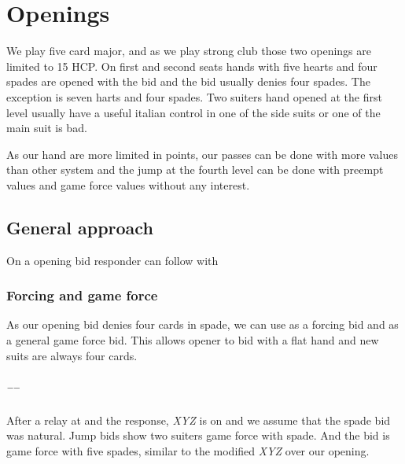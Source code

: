 \chapter{\bid{1\HS/\SpS} Openings}
We play five card major, and as we play strong club those two openings are limited to 15 HCP. On first and second seats hands with five hearts and four spades are opened with the \bid{2\HS} bid and the \bid{1\HS} bid usually denies four spades. The exception is seven harts and four spades. Two suiters hand opened at the first level usually have a useful italian control in one of the side suits or one of the main suit is bad.

As our hand are more limited in points, our passes can be done with more values than other system and the jump at the fourth level can be done with preempt values and game force values without any interest. 
\section{General approach}
On a \bid{1\HS/\SpS} opening bid responder can follow with
\subsection{\bid{1\SpS} Forcing and \bid{1\NT} game force}
As our \bid{1\HS} opening bid denies four cards in spade, we can use \bid{1\SpS} as a forcing bid and \bid{1\NT} as a general game force bid. This allows opener to bid \bid{1\NT} with a flat hand and new suits are always four cards. 
\paragraph{\bid{1\HS}–\bid{1\SpS}–\bid{1\NT}}
After a relay at \bid{1\SpS} and the \bid{1\NT} response, \emph{XYZ} is on and we assume that the spade bid was natural. Jump bids show two suiters game force with spade. And the \bid{2\NT} bid is game force with five spades, similar to the modified \emph{XYZ} over our \bid{1\DS} opening.

